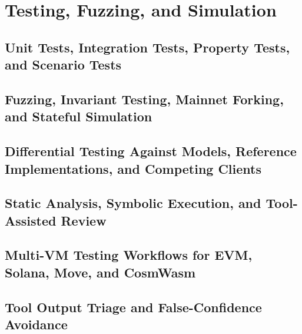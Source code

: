\chapter{Testing, Fuzzing, and Simulation}

\section{Unit Tests, Integration Tests, Property Tests, and Scenario Tests}

\section{Fuzzing, Invariant Testing, Mainnet Forking, and Stateful Simulation}

\section{Differential Testing Against Models, Reference Implementations, and Competing Clients}

\section{Static Analysis, Symbolic Execution, and Tool-Assisted Review}

\section{Multi-VM Testing Workflows for EVM, Solana, Move, and CosmWasm}

\section{Tool Output Triage and False-Confidence Avoidance}
